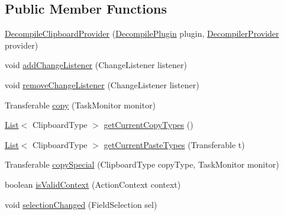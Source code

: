 \subsection*{Public Member Functions}
\begin{DoxyCompactItemize}
\item 
\mbox{\hyperlink{classghidra_1_1app_1_1plugin_1_1core_1_1decompile_1_1_decompile_clipboard_provider_a50f13d56701f01a939b8d24a46d153c4}{Decompile\+Clipboard\+Provider}} (\mbox{\hyperlink{classghidra_1_1app_1_1plugin_1_1core_1_1decompile_1_1_decompile_plugin}{Decompile\+Plugin}} plugin, \mbox{\hyperlink{classghidra_1_1app_1_1plugin_1_1core_1_1decompile_1_1_decompiler_provider}{Decompiler\+Provider}} provider)
\item 
void \mbox{\hyperlink{classghidra_1_1app_1_1plugin_1_1core_1_1decompile_1_1_decompile_clipboard_provider_ab59aa52d4850ee67d75f822f1d27be03}{add\+Change\+Listener}} (Change\+Listener listener)
\item 
void \mbox{\hyperlink{classghidra_1_1app_1_1plugin_1_1core_1_1decompile_1_1_decompile_clipboard_provider_aaf0727838798dc3d26c7e656247d3440}{remove\+Change\+Listener}} (Change\+Listener listener)
\item 
Transferable \mbox{\hyperlink{classghidra_1_1app_1_1plugin_1_1core_1_1decompile_1_1_decompile_clipboard_provider_ab7bc9b222a51e9d926ff7e289b8bc0f4}{copy}} (Task\+Monitor monitor)
\item 
\mbox{\hyperlink{xml_8hh_ab5ab62f46b3735557c125f91b40ac155}{List}}$<$ Clipboard\+Type $>$ \mbox{\hyperlink{classghidra_1_1app_1_1plugin_1_1core_1_1decompile_1_1_decompile_clipboard_provider_a1b065f3cdb8322a595193edf86ffb6f1}{get\+Current\+Copy\+Types}} ()
\item 
\mbox{\hyperlink{xml_8hh_ab5ab62f46b3735557c125f91b40ac155}{List}}$<$ Clipboard\+Type $>$ \mbox{\hyperlink{classghidra_1_1app_1_1plugin_1_1core_1_1decompile_1_1_decompile_clipboard_provider_a82c67c476f9a1433ee1221fa12edce1b}{get\+Current\+Paste\+Types}} (Transferable t)
\item 
Transferable \mbox{\hyperlink{classghidra_1_1app_1_1plugin_1_1core_1_1decompile_1_1_decompile_clipboard_provider_a508c7b98f33673f883e47ba7c3ba60cf}{copy\+Special}} (Clipboard\+Type copy\+Type, Task\+Monitor monitor)
\item 
boolean \mbox{\hyperlink{classghidra_1_1app_1_1plugin_1_1core_1_1decompile_1_1_decompile_clipboard_provider_a8666a63089d336d5330a413b51996978}{is\+Valid\+Context}} (Action\+Context context)
\item 
void \mbox{\hyperlink{classghidra_1_1app_1_1plugin_1_1core_1_1decompile_1_1_decompile_clipboard_provider_a34748b26487a204609f3cecfdeb79b5f}{selection\+Changed}} (Field\+Selection sel)

\end{DoxyCompactItemize}
